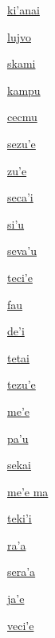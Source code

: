 {\hyperlink{val:kihanai}{ki'anai}}{}{}{}

{\hyperlink{val:lujvo}{lujvo}}{}{}{}

{\hyperlink{val:skami}{skami}}{}{}{}

{\hyperlink{val:kampu}{kampu}}{}{}{}

{\hyperlink{val:cecmu}{cecmu}}{}{}{}

{\hyperlink{val:sezuhe}{sezu'e}}{}{}{}

{\hyperlink{val:zuhe}{zu'e}}{}{}{}

{\hyperlink{val:secahi}{seca'i}}{}{}{}

{\hyperlink{val:sihu}{si'u}}{}{}{}

{\hyperlink{val:sevahu}{seva'u}}{}{}{}

{\hyperlink{val:tecihe}{teci'e}}{}{}{}

{\hyperlink{val:fau}{fau}}{}{}{}

{\hyperlink{val:dehi}{de'i}}{}{}{}

{\hyperlink{val:tetai}{tetai}}{}{}{}

{\hyperlink{val:tezuhe}{tezu'e}}{}{}{}

{\hyperlink{val:mehe}{me'e}}{}{}{}

{\hyperlink{val:pahu}{pa'u}}{}{}{}

{\hyperlink{val:sekai}{sekai}}{}{}{}

{\hyperlink{val:mehe ma}{me'e ma}}{}{}{}

{\hyperlink{val:tekihi}{teki'i}}{}{}{}

{\hyperlink{val:raha}{ra'a}}{}{}{}

{\hyperlink{val:seraha}{sera'a}}{}{}{}

{\hyperlink{val:jahe}{ja'e}}{}{}{}

{\hyperlink{val:vecihe}{veci'e}}{}{}{}

